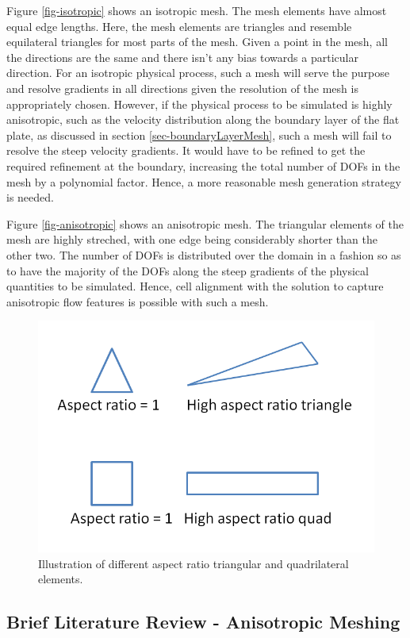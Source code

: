 Figure \ref{fig-isotropic} shows an isotropic mesh. The mesh elements have almost equal edge lengths. Here, the mesh elements are triangles and resemble equilateral triangles for most parts of the mesh. Given a point in the mesh, all the directions are the same and there isn't any bias towards a particular direction. For an isotropic physical process, such a mesh will serve the purpose and resolve gradients in all directions given the resolution of the mesh is appropriately chosen. However, if the physical process to be simulated is highly anisotropic, such as the velocity distribution along the boundary layer of the flat plate, as discussed in section \ref{sec-boundaryLayerMesh}, such a mesh will fail to resolve the steep velocity gradients. It would have to be refined to get the required refinement at the boundary, increasing the total number of DOFs in the mesh by a polynomial factor. Hence, a more reasonable mesh generation strategy is needed.

Figure \ref{fig-anisotropic} shows an anisotropic mesh. The triangular elements of the mesh are highly streched, with one edge being considerably shorter than the other two. The number of DOFs is distributed over the domain in a fashion so as to have the majority of the DOFs along the steep gradients of the physical quantities to be simulated. Hence, cell alignment with the solution to capture anisotropic flow features is possible with such a mesh.

\begin{figure}
	\centering
	\includegraphics[width=0.6\linewidth]{img/intro/aspectRatio.png}
	\caption{Illustration of different aspect ratio triangular and quadrilateral elements.}
	\label{fig-AR}
\end{figure}

\subsection{Brief Literature Review - Anisotropic Meshing}

